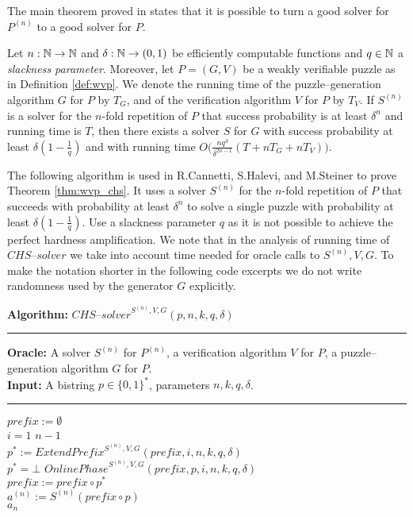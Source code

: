 The main theorem proved in \cite{canetti2004hardness} states that it is possible to turn a good solver for
$P^{(n)}$ to a good solver for $P$.
%
\begin{theorem}
  \label{thm:wvp_chs}
Let $n:\mathbb{N} \rightarrow \mathbb{N}$ and $\delta: \mathbb{N} \rightarrow (0,1)$ be efficiently computable functions and $q \in \mathbb{N}$ a \textit{slackness parameter}.
Moreover, let $P = (G,V)$ be a weakly verifiable puzzle as in Definition \ref{def:wvp}. We denote the running time of the
puzzle--generation algorithm $G$ for $P$ by $T_G$, and of the verification algorithm $V$ for $P$ by $T_V$.
If $S^{(n)}$ is a solver for the $n$-fold repetition of $P$ that success probability is at least $\delta^{n}$
and running time is $T$, then there exists a solver $S$ for $G$ with success probability at least $\delta(1-\frac{1}{q})$ and with running time
$O\Big(\frac{nq^3}{\delta^{2n-1}}(T + nT_G + nT_V)\Big)$.
\end{theorem}
%
The following algorithm is used in R.Cannetti, S.Halevi, and M.Steiner to prove Theorem \ref{thm:wvp_chs}.
It uses a solver $S^{(n)}$ for the $n$-fold repetition of $P$ that succeeds with probability at least $\delta^{n}$
to solve a single puzzle with probability at least $\delta(1  - \frac{1}{q})$. Use a slackness parameter $q$ as it is not possible to achieve
the perfect hardness amplification. We note that in the analysis of running time of $\mathit{CHS\text{--}solver}$
we take into account time needed for oracle calls to $S^{(n)}, V, G$.
%
To make the notation shorter in the following code excerpts we do not write randomness used by the generator $G$ explicitly.
\begin{codeblock}
  \textbf{Algorithm:} $\mathit{CHS\text{--}solver}^{S^{(n)},V,G}(p, n, k, q, \delta)$
  \medskip\hrule
  \textbf{Oracle:} A solver $S^{(n)}$ for $P^{(n)}$, a verification algorithm $V$ for $P$, a puzzle--generation algorithm $G$ for $P$.\\
  \textbf{Input:}  A bistring $p \in \{0,1\}^{*}$, parameters $n, k, q, \delta$.
  \medskip\hrule
  $\mathit{prefix} := \emptyset$\\
  \For $i = 1$ \To $n-1$ \Do \\
  \IndI $p^* := \mathit{ExtendPrefix}^{S^{(n)}, V, G}(\mathit{prefix}, i, n, k, q, \delta)$\\
  \IndI \If $p^* = \bot$ \Then \Return $\mathit{OnlinePhase}^{S^{(n)}, V, G}(\mathit{prefix}, p, i, n, k, q, \delta)$ \\
  \IndI \Else $\mathit{prefix} := \mathit{prefix} \circ p^*$\\
  $ a^{(n)} := S^{(n)}(\mathit{prefix} \circ p)$ \\
  \Return $a_n$
\end{codeblock}
